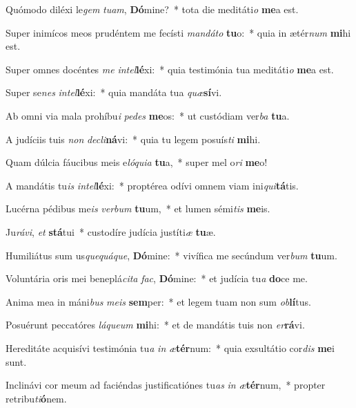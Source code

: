 \item Quómodo diléxi le\textit{gem} \textit{tu}\textit{am}, \textbf{Dó}mine?~* tota die meditáti\textit{o} \textbf{me}a est.
\item Super inimícos meos prudéntem me fecísti \textit{man}\textit{dá}\textit{to} \textbf{tu}o:~* quia in ætér\textit{num} \textbf{mi}hi est.
\item Super omnes docéntes \textit{me} \textit{in}\textit{tel}\textbf{lé}xi:~* quia testimónia tua meditáti\textit{o} \textbf{me}a est.
\item Super se\textit{nes} \textit{in}\textit{tel}\textbf{lé}xi:~* quia mandáta tua \textit{quæ}\textbf{sí}vi.
\item Ab omni via mala prohíbu\textit{i} \textit{pe}\textit{des} \textbf{me}os:~* ut custódiam ver\textit{ba} \textbf{tu}a.
\item A judíciis tuis \textit{non} \textit{de}\textit{cli}\textbf{ná}vi:~* quia tu legem posuís\textit{ti} \textbf{mi}hi.
\item Quam dúlcia fáucibus meis e\textit{ló}\textit{qui}\textit{a} \textbf{tu}a,~* super mel o\textit{ri} \textbf{me}o!
\item A mandátis tu\textit{is} \textit{in}\textit{tel}\textbf{lé}xi:~* proptérea odívi omnem viam ini\textit{qui}\textbf{tá}tis.
\item Lucérna pédibus me\textit{is} \textit{ver}\textit{bum} \textbf{tu}um,~* et lumen sémi\textit{tis} \textbf{me}is.
\item Ju\textit{rá}\textit{vi}, \textit{et} \textbf{stá}tui~* custodíre judícia justíti\textit{æ} \textbf{tu}æ.
\item Humiliátus sum us\textit{que}\textit{quá}\textit{que}, \textbf{Dó}mine:~* vivífica me secúndum ver\textit{bum} \textbf{tu}um.
\item Voluntária oris mei beneplá\textit{ci}\textit{ta} \textit{fac}, \textbf{Dó}mine:~* et judícia tu\textit{a} \textbf{do}ce me.
\item Anima mea in máni\textit{bus} \textit{me}\textit{is} \textbf{sem}per:~* et legem tuam non sum \textit{ob}\textbf{lí}tus.
\item Posuérunt peccatóres \textit{lá}\textit{que}\textit{um} \textbf{mi}hi:~* et de mandátis tuis non \textit{er}\textbf{rá}vi.
\item Hereditáte acquisívi testimónia tu\textit{a} \textit{in} \textit{æ}\textbf{tér}num:~* quia exsultátio cor\textit{dis} \textbf{me}i sunt.
\item Inclinávi cor meum ad faciéndas justificatiónes tu\textit{as} \textit{in} \textit{æ}\textbf{tér}num,~* propter retribu\textit{ti}\textbf{ó}nem.
